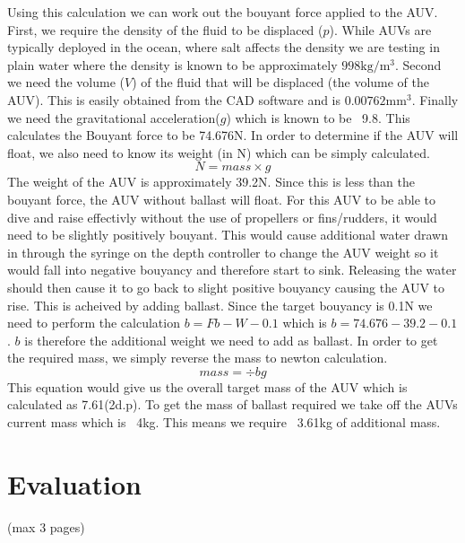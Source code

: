 \documentclass[11pt,a4paper,titlepage]{report}
\begin{document}
	Using this calculation we can work out the bouyant force applied to the AUV. First, we require the density of the fluid to be displaced ($p$). While AUVs are typically deployed in the ocean, where salt affects the density we are testing in plain water where the density is known to be approximately $998\unit{\kilo\gram}/\unit{\meter}^{3}$. Second we need the volume ($V$) of the fluid that will be displaced (the volume of the AUV). This is easily obtained from the CAD software and is $0.00762\unit{\milli\meter}^{3}$. Finally we need the gravitational acceleration($g$) which is known to be ~9.8. This calculates the Bouyant force to be 74.676\unit{\newton}. In order to determine if the AUV will float, we also need to know its weight (in \unit{\newton}) which can be simply calculated. 
	$$
	N = mass \times g
	$$
	The weight of the AUV is approximately 39.2\unit{\newton}. Since this is less than the bouyant force, the AUV without ballast will float. For this AUV to be able to dive and raise effectivly without the use of propellers or fins/rudders, it would need to be slightly positively bouyant. This would cause additional water drawn in through the syringe on the depth controller to change the AUV weight so it would fall into negative bouyancy and therefore start to sink. Releasing the water should then cause it to go back to slight positive bouyancy causing the AUV to rise. This is acheived by adding ballast. Since the target bouyancy is 0.1\unit{\newton} we need to perform the calculation $b = Fb - W - 0.1$ which is $b = 74.676 - 39.2 - 0.1$. $b$ is therefore the additional weight we need to add as ballast. In order to get the required mass, we simply reverse the mass to newton calculation. 
	$$
	mass = \div{b}{g}
	$$
	This equation would give us the overall target mass of the AUV which is calculated as 7.61(2d.p). To get the mass of ballast required we take off the AUVs current mass which is ~4\unit{\kilo\gram}. This means we require ~3.61\unit{\kilo\gram} of additional mass. 
	
	
	\chapter*{Evaluation}
	
	(max 3 pages)
	
\end{document}
